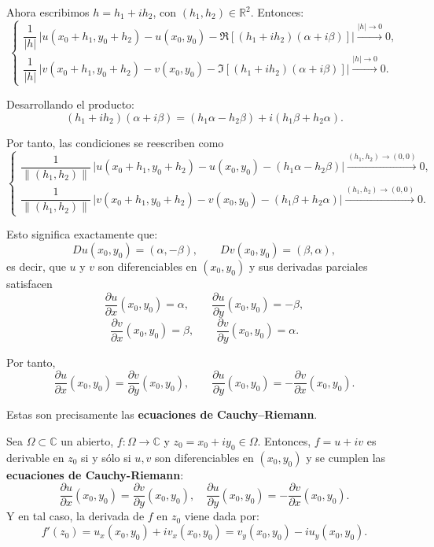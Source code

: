 Ahora escribimos $h = h_1 + i h_2$, con $(h_1,h_2)\in\mathbb{R}^2$. Entonces:
\[
\begin{cases}
\dfrac{1}{|h|}\,\big|u(x_0+h_1,y_0+h_2) - u(x_0,y_0) - \Re[(h_1+i h_2)(\alpha+i\beta)]\big| \xrightarrow{|h|\to 0} 0, \\[2ex]
\dfrac{1}{|h|}\,\big|v(x_0+h_1,y_0+h_2) - v(x_0,y_0) - \Im[(h_1+i h_2)(\alpha+i\beta)]\big| \xrightarrow{|h|\to 0} 0.
\end{cases}
\]

Desarrollando el producto:
\[
(h_1+i h_2)(\alpha+i\beta) = (h_1\alpha - h_2\beta) + i(h_1\beta + h_2\alpha).
\]

Por tanto, las condiciones se reescriben como
\[
\begin{cases}
\dfrac{1}{\|(h_1,h_2)\|}\,\big|u(x_0+h_1,y_0+h_2) - u(x_0,y_0) - (h_1\alpha - h_2\beta)\big| \xrightarrow{(h_1,h_2)\to (0,0)} 0, \\[2ex]
\dfrac{1}{\|(h_1,h_2)\|}\,\big|v(x_0+h_1,y_0+h_2) - v(x_0,y_0) - (h_1\beta + h_2\alpha)\big| \xrightarrow{(h_1,h_2)\to (0,0)} 0.
\end{cases}
\]

Esto significa exactamente que:
\[
Du(x_0,y_0) = (\alpha,-\beta), \qquad Dv(x_0,y_0) = (\beta,\alpha),
\]
es decir, que $u$ y $v$ son diferenciables en $(x_0,y_0)$ y sus derivadas parciales satisfacen
\[
\frac{\partial u}{\partial x}(x_0,y_0) = \alpha, 
\qquad 
\frac{\partial u}{\partial y}(x_0,y_0) = -\beta,
\]
\[
\frac{\partial v}{\partial x}(x_0,y_0) = \beta, 
\qquad 
\frac{\partial v}{\partial y}(x_0,y_0) = \alpha.
\]

Por tanto,
\[
\frac{\partial u}{\partial x}(x_0,y_0) = \frac{\partial v}{\partial y}(x_0,y_0), 
\qquad 
\frac{\partial u}{\partial y}(x_0,y_0) = -\frac{\partial v}{\partial x}(x_0,y_0).
\]

Estas son precisamente las \textbf{ecuaciones de Cauchy–Riemann}.
\begin{teorema}
    Sea $\Omega \subset \mathbb{C}$ un abierto, $f : \Omega \to \mathbb{C}$ y $z_0 = x_0 + i y_0 \in \Omega$. Entonces, $f = u+iv$ es derivable en $z_0$ si y sólo si $u, v$ son diferenciables en $(x_0, y_0)$ y se cumplen las \textbf{ecuaciones de Cauchy-Riemann}:
    \[
        \frac{\partial u}{\partial x}(x_0, y_0) = \frac{\partial v}{\partial y}(x_0, y_0), \quad \frac{\partial u}{\partial y}(x_0, y_0) = -\frac{\partial v}{\partial x}(x_0, y_0).
    \]
    Y en tal caso, la derivada de $f$ en $z_0$ viene dada por:
    \[
        f'(z_0) = u_x(x_0, y_0) + i v_x(x_0, y_0) = v_y(x_0, y_0) - i u_y(x_0, y_0).
    \]
\end{teorema}


